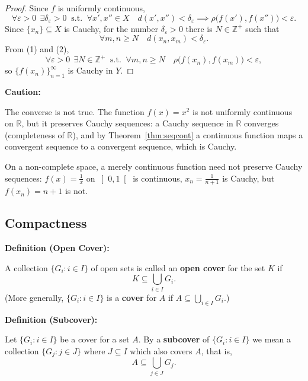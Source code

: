 \documentclass[11pt,a4paper]{article}
\newcommand{\R}{\mathbb{R}}
\newcommand{\Z}{\mathbb{Z}}
\newenvironment{definition}[1]{
	\begin{definitionbox}
		\textbf{\color{primaryColor}Definition (#1):} 
	}{
	\end{definitionbox}
}
\newenvironment{caution}{
	\begin{cautionbox}
		\textbf{\color{cautionColor}Caution:} 
	}{
	\end{cautionbox}
}
\begin{document}
	\begin{proof}
		Since $f$ is uniformly continuous,
		\[
		\forall \varepsilon>0 \ \ \exists \delta_\varepsilon>0 \ \text{ s.t. } \ \forall x',x''\in X \quad d(x',x'')<\delta_\varepsilon \implies \rho\bigl(f(x'),f(x'')\bigr)<\varepsilon . \tag{1}
		\]
		Since $\{x_n\}\subseteq X$ is Cauchy, for the number $\delta_\varepsilon>0$ there is $N\in\Z^+$ such that
		\[
		\forall m,n\ge N \quad d(x_n,x_m)<\delta_\varepsilon . \tag{2}
		\]
		From (1) and (2),
		\[
		\forall \varepsilon>0 \ \ \exists N\in\Z^+ \ \text{ s.t. } \ \forall m,n\ge N \quad \rho\bigl(f(x_n),f(x_m)\bigr)<\varepsilon ,
		\]
		so $\{f(x_n)\}_{n=1}^{\infty}$ is Cauchy in $Y$.
	\end{proof}
	
	\begin{caution}
		The converse is not true. The function $f(x)=x^2$ is not uniformly continuous on $\R$, but it preserves Cauchy sequences: a Cauchy sequence in $\R$ converges (completeness of $\R$), and by Theorem~\ref{thm:seqcont} a continuous function maps a convergent sequence to a convergent sequence, which is Cauchy.
		
		\smallskip
		\noindent On a non-complete space, a merely continuous function need not preserve Cauchy sequences: $f(x) = \tfrac1x$ on $\left]0,1\right[$ is continuous, $x_n = \tfrac1{n+1}$ is Cauchy, but $f(x_n) = n+1$ is not.
	\end{caution}
	
	\subsection{Compactness}
	
	\begin{definition}{Open Cover}
		A collection $\{G_i : i\in I\}$ of open sets is called an \textbf{open cover} for the set $K$ if
		\[
		K\subseteq \bigcup_{i\in I} G_i .
		\]
		(More generally, $\{G_i:i\in I\}$ is a \textbf{cover} for $A$ if $A\subseteq\bigcup_{i\in I}G_i$.)
	\end{definition}
	
	\begin{definition}{Subcover}
		Let $\{G_i:i\in I\}$ be a cover for a set $A$. By a \textbf{subcover} of $\{G_i:i\in I\}$ we mean a collection $\{G_j:j\in J\}$ where $J\subseteq I$ which also covers $A$, that is,
		\[
		A\subseteq\bigcup_{j\in J} G_j .
		\]
	\end{definition}
	
\end{document}
